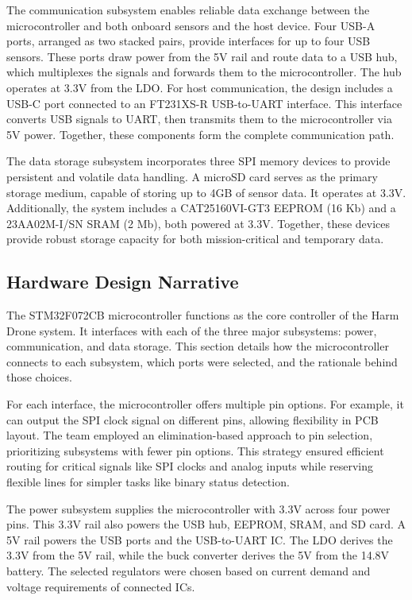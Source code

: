 \documentclass[12pt]{article}
\begin{document}
The communication subsystem enables reliable data exchange between the microcontroller and both onboard sensors and the host device. Four USB-A ports, arranged as two stacked pairs, provide interfaces for up to four USB sensors. These ports draw power from the 5V rail and route data to a USB hub, which multiplexes the signals and forwards them to the microcontroller. The hub operates at 3.3V from the LDO. For host communication, the design includes a USB-C port connected to an FT231XS-R USB-to-UART interface. This interface converts USB signals to UART, then transmits them to the microcontroller via 5V power. Together, these components form the complete communication path.

The data storage subsystem incorporates three SPI memory devices to provide persistent and volatile data handling. A microSD card serves as the primary storage medium, capable of storing up to 4GB of sensor data. It operates at 3.3V. Additionally, the system includes a CAT25160VI-GT3 EEPROM (16 Kb) and a 23AA02M-I/SN SRAM (2 Mb), both powered at 3.3V. Together, these devices provide robust storage capacity for both mission-critical and temporary data.

\subsection{Hardware Design Narrative}

The STM32F072CB microcontroller functions as the core controller of the Harm Drone system. It interfaces with each of the three major subsystems: power, communication, and data storage. This section details how the microcontroller connects to each subsystem, which ports were selected, and the rationale behind those choices.

For each interface, the microcontroller offers multiple pin options. For example, it can output the SPI clock signal on different pins, allowing flexibility in PCB layout. The team employed an elimination-based approach to pin selection, prioritizing subsystems with fewer pin options. This strategy ensured efficient routing for critical signals like SPI clocks and analog inputs while reserving flexible lines for simpler tasks like binary status detection.

The power subsystem supplies the microcontroller with 3.3V across four power pins. This 3.3V rail also powers the USB hub, EEPROM, SRAM, and SD card. A 5V rail powers the USB ports and the USB-to-UART IC. The LDO derives the 3.3V from the 5V rail, while the buck converter derives the 5V from the 14.8V battery. The selected regulators were chosen based on current demand and voltage requirements of connected ICs.
\end{document}
